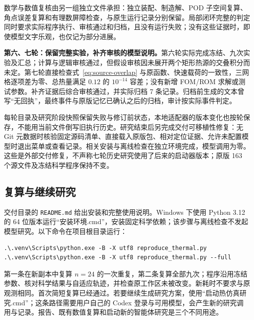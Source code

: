 数学与数值复核由另一组独立文件承担：独立装配、制造解、POD 子空间复算、角点误差复算和有理数屏障检查，与原生运行记录分别保留。局部闭环完整的判定同时要求实际程序执行、审核通过和归档，且没有运行失败；没有这些证据时，即使模型文字乐观，也仅记为部分进展。

\textbf{第六、七轮：保留完整实验，补齐审核的模型说明。}第六轮实际完成冻结、九次实验及汇总；计算与逻辑审核通过，但假设审核因未展开两个矩形热源的交叠积分而未定。第七轮直接检查式~\eqref{eq:source-overlap} 与原函数、快速载荷的一致性，三网格逐项差为零、总热量满足 $0.12$ 的 $10^{-14}$ 容差；没有新增 FOM/ROM 求解或测试参数。补齐证据后综合审核通过，并实际归档 7 条记录。归档前生成的文本曾写“无回执”，最终事件与原版记忆已确认之后的归档，审计按实际事件判定。

每轮目录及研究阶段快照保留失败与修订前状态，本地适配器的版本变化也按轮保存，不能用当前文件倒写旧执行历史。研究结束后另完成交付可移植性修复：无 Git 元数据时核验固定源码清单、直接载入原版包、相对定位证据、允许未配置模型时退出菜单或查看记录。相关安装与离线检查在独立环境完成，模型调用为零。这些是外部交付修复，不声称七轮历史研究使用了后来的启动器版本；原版 163 个源文件及冻结科学程序保持不变。

\begin{samepage}
\subsection{复算与继续研究}
交付目录的 \texttt{README.md} 给出安装和完整使用说明。Windows 下使用 Python 3.12 的 64 位版本运行“安装环境.cmd”，安装固定科学依赖；该步骤与离线检查不发起模型研究。以下命令在项目根目录运行：
\begin{verbatim}
.\.venv\Scripts\python.exe -B -X utf8 reproduce_thermal.py
.\.venv\Scripts\python.exe -B -X utf8 reproduce_thermal.py --full
\end{verbatim}
\end{samepage}
第一条在新副本中复算 $n=24$ 的一次重复，第二条复算全部九次；程序沿用冻结参数、核对科学结果与自适应轨迹，并检查原工作区未被改变。新耗时不要求与原观测相同。首次简短复算已经通过。若要继续生成研究方案，使用“启动热仿真研究.cmd”；这条路径需要用户自己的 Codex 登录与可用模型，会产生新的研究调用与记录。报告、既有数值复算和启动新的智能体研究是三个不同用途。
